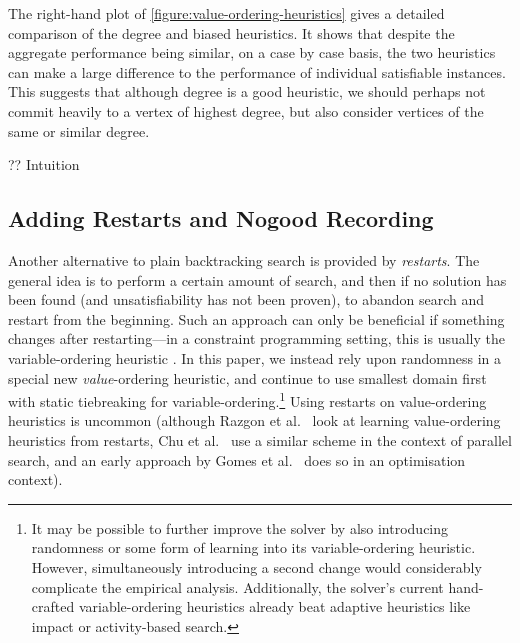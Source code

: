 \documentclass[runningheads]{llncs}
\newcommand{\siplineref}[1]{line~\ref{line:sip:#1}}
\newcommand{\citet}[2]{#1\cite{#2}}
\begin{document}
The right-hand plot of \cref{figure:value-ordering-heuristics} gives a detailed comparison of the
degree and biased heuristics. It shows that despite the aggregate
performance being similar, on a case by case basis, the two heuristics can make a large difference
to the performance of individual satisfiable instances. This suggests that although degree is a good
heuristic, we should perhaps not commit heavily to a vertex of highest degree, but also consider
vertices of the same or similar degree.

?? Intuition

\subsection{Adding Restarts and Nogood Recording}

Another alternative to plain backtracking search is provided by \emph{restarts}. The general idea is
to perform a certain amount of search, and then if no solution has been found (and unsatisfiability
has not been proven), to abandon search and restart from the beginning. Such an approach
can only be beneficial if something changes after restarting---in a constraint programming setting,
this is usually the variable-ordering heuristic
\cite{DBLP:journals/jsat/LecoutreSTV07,DBLP:conf/cp/GayHLS15,DBLP:conf/aaai/LeeSZ16,DBLP:conf/cp/GlorianBLLM17}.
In this paper, we instead rely upon randomness in a special new \emph{value}-ordering heuristic, and continue
to use smallest domain first with static tiebreaking for variable-ordering.\footnote{It may be
possible to further improve the solver by also introducing randomness or some form of
learning into its variable-ordering heuristic. However, simultaneously introducing a second change
would considerably complicate the empirical analysis. Additionally, the solver's current
hand-crafted variable-ordering heuristics already beat adaptive heuristics like impact or
activity-based search.} Using restarts on value-ordering heuristics is uncommon (although
\citet{Razgon et al.\ }{DBLP:conf/flairs/RazgonOP07} look at learning value-ordering heuristics from
restarts, \citet{Chu et al.\ }{DBLP:conf/cp/ChuSS09} use a similar scheme in the context of parallel
search, and an early approach by \citet{Gomes et al.\ }{DBLP:conf/aaai/GomesSK98} does so in an
optimisation context).

\end{document}
